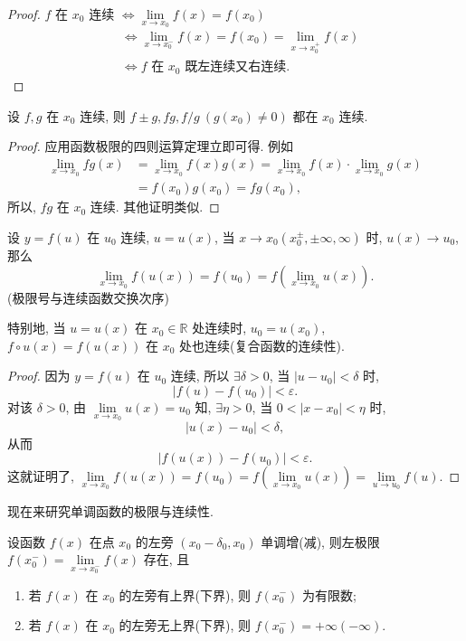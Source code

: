\begin{proof}
$f$ 在 $x_0$ 连续 $\iff \lim\limits_{x \to x_0} f(x) = f(x_0)$
\begin{align*}
&\iff \lim_{x \to x_0^-} f(x) = f(x_0) = \lim_{x \to x_0^+} f(x) \\
&\iff f \text{ 在 } x_0 \text{ 既左连续又右连续}.
\end{align*}
\end{proof}

\begin{theorem}[连续的四则运算]\label{thm:2.4.2}
设 $f, g$ 在 $x_0$ 连续, 则 $f \pm g, fg, f/g\ (g(x_0) \neq 0)$ 都在 $x_0$ 连续.
\end{theorem}

\begin{proof}
应用函数极限的四则运算定理立即可得. 例如
\begin{align*}
\lim_{x \to x_0} fg(x) &= \lim_{x \to x_0} f(x) g(x) = \lim_{x \to x_0} f(x) \cdot \lim_{x \to x_0} g(x) \\
&= f(x_0) g(x_0) = fg(x_0),
\end{align*}
所以, $fg$ 在 $x_0$ 连续. 其他证明类似.
\end{proof}

\begin{theorem}[复合函数的连续性]\label{thm:2.4.3}
设 $y = f(u)$ 在 $u_0$ 连续, $u = u(x)$, 当 $x \to x_0(x_0^{\pm}, \pm\infty, \infty)$ 时, $u(x) \to u_0$, 那么
\[
\lim_{x \to x_0} f(u(x)) = f(u_0) = f\left(\lim_{x \to x_0} u(x)\right).
\]
(极限号与连续函数交换次序)

特别地, 当 $u = u(x)$ 在 $x_0 \in \mathbb{R}$ 处连续时, $u_0 = u(x_0)$, $f \circ u(x) = f(u(x))$ 在 $x_0$ 处也连续(复合函数的连续性).
\end{theorem}

\begin{proof}
因为 $y = f(u)$ 在 $u_0$ 连续, 所以 $\exists \delta > 0$, 当 $|u - u_0| < \delta$ 时,
\[
|f(u) - f(u_0)| < \varepsilon.
\]
对该 $\delta > 0$, 由 $\lim\limits_{x \to x_0} u(x) = u_0$ 知, $\exists \eta > 0$, 当 $0 < |x - x_0| < \eta$ 时,
\[
|u(x) - u_0| < \delta,
\]
从而
\[
|f(u(x)) - f(u_0)| < \varepsilon.
\]
这就证明了, $\lim\limits_{x \to x_0} f(u(x)) = f(u_0) = f\left(\lim\limits_{x \to x_0} u(x)\right) = \lim\limits_{u \to u_0} f(u)$.
\end{proof}

现在来研究单调函数的极限与连续性.

\begin{lemma}\label{lem:2.4.1}
设函数 $f(x)$ 在点 $x_0$ 的左旁 $(x_0 - \delta_0, x_0)$ 单调增(减), 则左极限 $f(x_0^-) = \lim\limits_{x \to x_0^-} f(x)$ 存在, 且
\begin{enumerate}[label=(\arabic*)]
  \item 若 $f(x)$ 在 $x_0$ 的左旁有上界(下界), 则 $f(x_0^-)$ 为有限数;
  \item 若 $f(x)$ 在 $x_0$ 的左旁无上界(下界), 则 $f(x_0^-) = +\infty(-\infty)$.
\end{enumerate}
\end{lemma}

